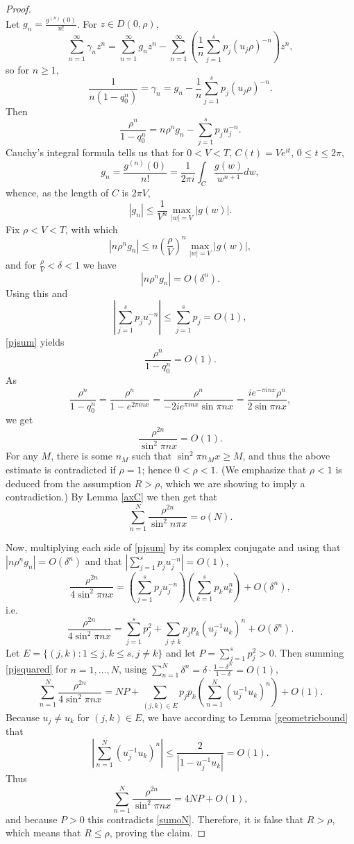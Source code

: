 \documentclass{article}
\begin{document}
\begin{proof}
\[\]
Let $g_n = \frac{g^{(n)}(0)}{n!}$. 
For $z \in D(0,\rho)$,
\[
\sum_{n=1}^\infty \gamma_n z^n = \sum_{n=1}^\infty g_n z^n - \sum_{n=1}^\infty  \left(  \frac{1}{n} \sum_{j=1}^s p_j (u_j \rho)^{-n} \right) z^n,
\]
so for $n \geq 1$,
\[
 \frac{1}{n(1-q_0^n)} = \gamma_n = g_n -  \frac{1}{n} \sum_{j=1}^s p_j (u_j \rho)^{-n}.
\]
Then
\begin{equation}
\frac{\rho^n}{1-q_0^n} = n \rho^n g_n - \sum_{j=1}^s p_j u_j^{-n}.
\label{pjsum}
\end{equation}
Cauchy's integral formula \cite[p.~82, Theorem 2.41]{titchmarsh} tells us that for $0<V<T$, $C(t) = V e^{it}$, $0 \leq t \leq 2\pi$,
\[
g_n =  \frac{g^{(n)}(0)}{n!} = \frac{1}{2\pi i} \int_C \frac{g(w)}{w^{n+1}} dw,
\]
whence, as the length of $C$ is $2\pi V$,
\[
|g_n| \leq \frac{1}{V^n} \max_{|w|=V} |g(w)|.
\]
Fix $\rho<V<T$, with which
\[
|n \rho^n g_n| \leq n \left(\frac{\rho}{V}\right)^n \max_{|w|=V} |g(w)|,
\] 
and for $\frac{\rho}{V} < \delta < 1$ we have
\[
|n\rho^n g_n| = O(\delta^{n}).
\] 
Using this and
\[
\left| \sum_{j=1}^s p_j u_j^{-n} \right| \leq \sum_{j=1}^s p_j = O(1),
\]
 \eqref{pjsum} yields
 \[
 \frac{\rho^n}{1-q_0^n} = O(1).
 \] 
As 
\[
\frac{\rho^n}{1-q_0^n} = \frac{\rho^n}{1-e^{2\pi inx}}
=\frac{\rho^n}{-2i e^{\pi inx} \sin \pi nx}
=\frac{i e^{-\pi inx} \rho^n}{2 \sin \pi nx},
\]
we get 
\[
\frac{\rho^{2n}}{\sin^2 \pi nx} = O(1).
\]
For any $M$, there is some $n_M$ such that $\sin^2 \pi n_M x \geq M$, and thus the above estimate is contradicted
if $\rho=1$; hence $0<\rho<1$. (We emphasize that $\rho<1$ is deduced from the assumption 
$R>\rho$, which we are showing to imply a contradiction.) 
By Lemma \ref{axC} we then get that 
\begin{equation}
\sum_{n=1}^N \frac{\rho^{2n}}{\sin^2 n\pi x} = o(N).
\label{sumoN}
\end{equation} 

Now, multiplying each side of  \eqref{pjsum} by its complex conjugate and using
that $|n\rho^n g_n| = O(\delta^n)$ and that
$\left|\sum_{j=1}^s p_j u_j^{-n} \right| = O(1)$,
\[
\frac{\rho^{2n}}{4\sin^2 \pi nx} = \left( \sum_{j=1}^s p_j u_j^{-n} \right)\left( \sum_{k=1}^s p_k u_k^{n} \right)
+O(\delta^n),
\]
i.e.
\begin{equation}
\frac{\rho^{2n}}{4\sin^2 \pi nx} = \sum_{j=1}^s p_j^2 + \sum_{j \neq k} p_j p_k (u_j^{-1} u_k)^n + O(\delta^n).
\label{pjsquared}
\end{equation}
Let $E=\{(j,k): 1 \leq j,k \leq s, j \neq k\}$ and let
$P=\sum_{j=1}^s p_j^2 > 0$.
Then summing \eqref{pjsquared} for $n=1,\ldots,N$,
using $\sum_{n=1}^N \delta^n = \delta\cdot \frac{1-\delta^N}{1-\delta} = O(1)$, 
\[
\sum_{n=1}^N \frac{\rho^{2n}}{4\sin^2 \pi nx} = NP + \sum_{(j,k) \in E} p_j p_k \left( \sum_{n=1}^N (u_j^{-1} u_k)^n \right) + O(1).
\]
Because $u_j \neq u_k$ for $(j,k) \in E$, we have according to Lemma \ref{geometricbound} that
\[
\left| \sum_{n=1}^N (u_j^{-1} u_k)^n \right| \leq \frac{2}{|1-u_j^{-1} u_k|} =O(1).
\]
Thus
\[
\sum_{n=1}^N \frac{\rho^{2n}}{\sin^2 \pi nx} = 4NP + O(1),
\]
and because $P>0$ this contradicts \eqref{sumoN}. Therefore, it is false that $R>\rho$, which means that
 $R \leq \rho$, proving the claim.
\end{proof}
\end{document}

